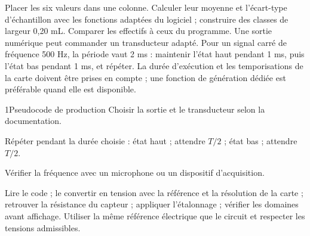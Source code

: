 Placer les six valeurs dans une colonne. Calculer leur moyenne et l'écart-type d'échantillon avec les fonctions adaptées du logiciel ; construire des classes de largeur 0,20 mL. Comparer les effectifs à ceux du programme.
Une sortie numérique peut commander un transducteur adapté. Pour un signal carré de fréquence 500 Hz, la période vaut 2 ms : maintenir l'état haut pendant 1 ms, puis l'état bas pendant 1 ms, et répéter. La durée d'exécution et les temporisations de la carte doivent être prises en compte ; une fonction de génération dédiée est préférable quand elle est disponible.
\begin{docu}{1}{Pseudocode de production}
Choisir la sortie et le transducteur selon la documentation.\par
Répéter pendant la durée choisie : état haut ; attendre $T/2$ ; état bas ; attendre $T/2$.\par
Vérifier la fréquence avec un microphone ou un dispositif d'acquisition.\end{docu}
Lire le code ; le convertir en tension avec la référence et la résolution de la carte ; retrouver la résistance du capteur ; appliquer l'étalonnage ; vérifier les domaines avant affichage. Utiliser la même référence électrique que le circuit et respecter les tensions admissibles.

